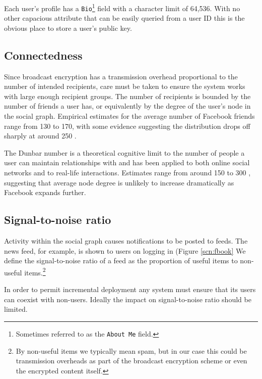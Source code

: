 Each user's profile has a {\tt Bio}\footnote{Sometimes referred to as the {\tt About Me} field.} field with a character limit of 64,536. With no other capacious attribute that can be easily queried from a user ID this is the obvious place to store a user's public key.

    
\subsection{Connectedness}
\label{sec:cness}

Since broadcast encryption has a transmission overhead proportional to the number of intended recipients, care must be taken to ensure the system works with large enough recipient groups. The number of recipients is bounded by the number of friends a user has, or equivalently by the degree of the user's node in the social graph. Empirical estimates for the average number of Facebook friends range from 130 to 170, with some evidence suggesting the distribution drops off sharply at around 250 \cite{fb-factsheet}\cite{fb-connectedness}.

The Dunbar number is a theoretical cognitive limit to the number of people a user can maintain relationships with and has been applied to both online social networks and to real-life interactions. Estimates range from around 150 to 300 \cite{dunbar} \cite{socnetsize}, suggesting that average node degree is unlikely to increase dramatically as Facebook expands further.


\subsection{Signal-to-noise ratio}
\label{sec:signoise}

Activity within the social graph causes notifications to be posted to feeds. The news feed, for example, is shown to users on logging in (Figure \ref{scn:fbook}  We define the signal-to-noise ratio of a feed as the proportion of useful items to non-useful items.\footnote{By non-useful items we typically mean spam, but in our case this could be transmission overheads as part of the broadcast encryption scheme or even the encrypted content itself.}

In order to permit incremental deployment any system must ensure that its users can coexist with non-users. Ideally the impact on signal-to-noise ratio should be limited.

